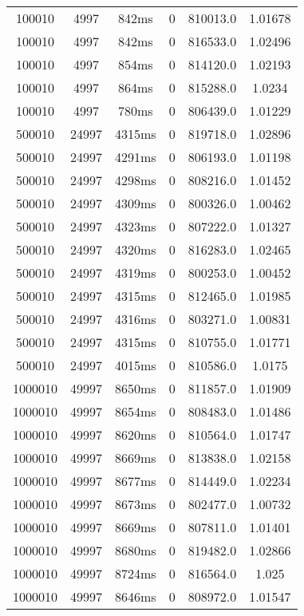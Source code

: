 \documentclass[./main.tex]{subfiles}
\begin{document}
\begin{table}
\begin{tabular}{ c | c | c | c | c | c }
        100010 & 4997 & 842ms & 0 & 810013.0 & 1.01678 \\
        100010 & 4997 & 842ms & 0 & 816533.0 & 1.02496 \\
        100010 & 4997 & 854ms & 0 & 814120.0 & 1.02193 \\
        100010 & 4997 & 864ms & 0 & 815288.0 & 1.0234 \\
        100010 & 4997 & 780ms & 0 & 806439.0 & 1.01229 \\
        \hline
        500010 & 24997 & 4315ms & 0 & 819718.0 & 1.02896 \\
        500010 & 24997 & 4291ms & 0 & 806193.0 & 1.01198 \\
        \rowcolor{lightgray} 500010 & 24997 & 4298ms & 0 & 808216.0 & 1.01452 \\
        500010 & 24997 & 4309ms & 0 & 800326.0 & 1.00462 \\
        500010 & 24997 & 4323ms & 0 & 807222.0 & 1.01327 \\
        500010 & 24997 & 4320ms & 0 & 816283.0 & 1.02465 \\
        500010 & 24997 & 4319ms & 0 & 800253.0 & 1.00452 \\
        500010 & 24997 & 4315ms & 0 & 812465.0 & 1.01985 \\
        500010 & 24997 & 4316ms & 0 & 803271.0 & 1.00831 \\
        500010 & 24997 & 4315ms & 0 & 810755.0 & 1.01771 \\
        500010 & 24997 & 4015ms & 0 & 810586.0 & 1.0175 \\
        \hline
        1000010 & 49997 & 8650ms & 0 & 811857.0 & 1.01909 \\
        1000010 & 49997 & 8654ms & 0 & 808483.0 & 1.01486 \\
        1000010 & 49997 & 8620ms & 0 & 810564.0 & 1.01747 \\
        1000010 & 49997 & 8669ms & 0 & 813838.0 & 1.02158 \\
        1000010 & 49997 & 8677ms & 0 & 814449.0 & 1.02234 \\
        1000010 & 49997 & 8673ms & 0 & 802477.0 & 1.00732 \\
        1000010 & 49997 & 8669ms & 0 & 807811.0 & 1.01401 \\
        1000010 & 49997 & 8680ms & 0 & 819482.0 & 1.02866 \\
        1000010 & 49997 & 8724ms & 0 & 816564.0 & 1.025 \\
        1000010 & 49997 & 8646ms & 0 & 808972.0 & 1.01547 \\

\end{tabular}
\end{table}
\end{document}
